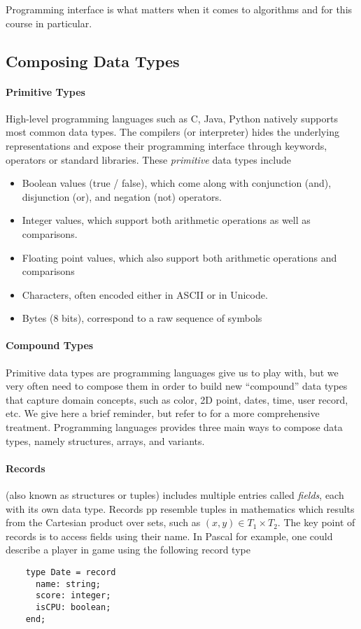 \documentclass{aldast}
\begin{document}
Programming interface is what matters when it comes to algorithms and
for this course in particular.

\subsection{Composing Data Types}

\paragraph{Primitive Types}

High-level programming languages such as C, Java, Python natively
supports most common data types. The compilers (or interpreter) hides
the underlying representations and expose their programming interface
through keywords, operators or standard libraries. These
\emph{primitive} data types include
\begin{itemize}
\item Boolean values (true / false), which come along with
  conjunction (and), disjunction (or), and negation (not) operators.
\item Integer values, which support both arithmetic operations as
  well as comparisons.
\item Floating point values, which also support both arithmetic
  operations and comparisons
\item Characters, often encoded either in ASCII or in Unicode.
\item Bytes (8 bits), correspond to a raw sequence of symbols
\end{itemize}

\paragraph{Compound Types}

Primitive data types are programming languages give us to play with,
but we very often need to compose them in order to build new
``compound'' data types that capture domain concepts, such as color,
2D point, dates, time, user record, etc. We give here a brief
reminder, but refer to \cite[Chap. 7]{scott2009} for a more
comprehensive treatment. Programming languages provides three main
ways to compose data types, namely structures, arrays, and variants.

\paragraph{Records} (also known as structures or tuples) includes
multiple entries called \emph{fields}, each with its own data
type. Records pp resemble tuples in mathematics which results from the
Cartesian product over sets, such as $(x,y) \in T_1 \times T_2$. The
key point of records is to access fields using their name. In Pascal
for example, one could describe a player in game using the following
record type
  \begin{verbatim}
    type Date = record
      name: string;
      score: integer;
      isCPU: boolean;
    end;
  \end{verbatim}
\end{document}
